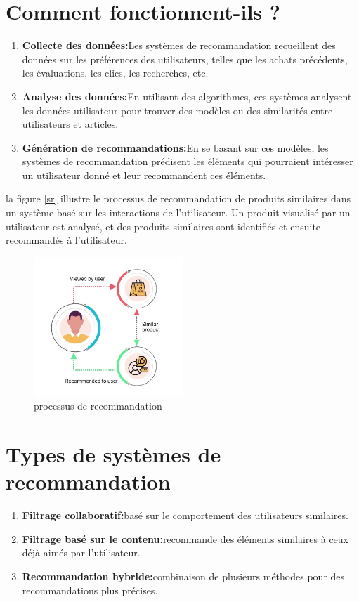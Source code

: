 \documentclass[edit,12pt,a4paper,ChapStyle,oneside,doubleinterligne]{report}
\begin{document}
\section{Comment fonctionnent-ils ?}
\begin{enumerate}
    \item \textbf{Collecte des données:}Les systèmes de recommandation recueillent des données sur les préférences des utilisateurs, telles que les achats précédents, les évaluations, les clics, les recherches, etc.
    \item \textbf{Analyse des données:}En utilisant des algorithmes, ces systèmes analysent les données utilisateur pour trouver des modèles ou des similarités entre utilisateurs et articles.
    \item \textbf{Génération de recommandations:}En se basant sur ces modèles, les systèmes de recommandation prédisent les éléments qui pourraient intéresser un utilisateur donné et leur recommandent ces éléments.
\end{enumerate}
la figure \ref{sr} illustre le processus de recommandation de produits similaires dans un système basé sur les interactions de l'utilisateur. Un produit visualisé par un utilisateur est analysé, et des produits similaires sont identifiés et ensuite recommandés à l'utilisateur.
\begin{figure}[H]
    \centering
    \includegraphics[width=0.5\textwidth]{images/recommendation system.jpg}
    \caption{processus de recommandation}
\end{figure}\label{sr}
\section{Types de systèmes de recommandation}
\begin{enumerate}
    \item \textbf{Filtrage collaboratif:}basé sur le comportement des utilisateurs similaires.
    \item \textbf{Filtrage basé sur le contenu:}recommande des éléments similaires à ceux déjà aimés par l'utilisateur.
    \item \textbf{Recommandation hybride:}combinaison de plusieurs méthodes pour des recommandations plus précises.
\end{enumerate}
\end{document}
